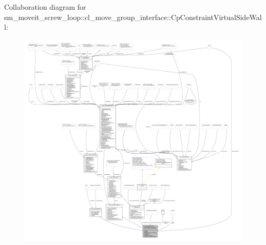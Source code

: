 Collaboration diagram for sm\+\_\+moveit\+\_\+screw\+\_\+loop\+:\+:cl\+\_\+move\+\_\+group\+\_\+interface\+:\+:Cp\+Constraint\+Virtual\+Side\+Wall\+:
\nopagebreak
\begin{figure}[H]
\begin{center}
\leavevmode
\includegraphics[width=350pt]{classsm__moveit__screw__loop_1_1cl__move__group__interface_1_1CpConstraintVirtualSideWall__coll__graph}
\end{center}
\end{figure}
